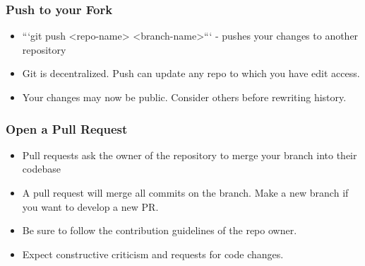 \documentclass[unknownkeysallowed]{beamer}
\begin{document}
\begin{frame}
    \frametitle{Push to your Fork}
    \begin{itemize}
        \item{```git push <repo-name> <branch-name>``` - pushes your changes to another repository }
        \item{Git is decentralized. Push can update any repo to which you have edit access.}
        \item{Your changes may now be public. Consider others before rewriting history.}
    \end{itemize}
\end{frame}

\begin{frame}
    \frametitle{Open a Pull Request}
    \begin{itemize}
        \item{Pull requests ask the owner of the repository to merge your branch into their codebase}
        \item{A pull request will merge all commits on the branch. Make a new branch if you want to develop a new PR.}
        \item{Be sure to follow the contribution guidelines of the repo owner.}
        \item{Expect constructive criticism and requests for code changes.}
    \end{itemize}
\end{frame}
\end{document}
